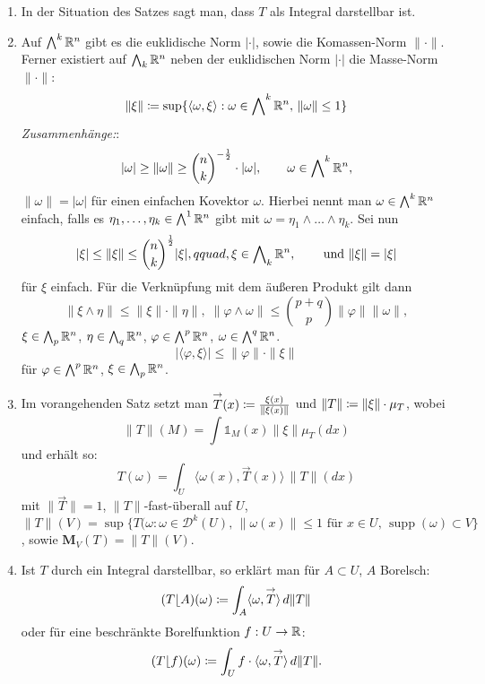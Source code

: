 \documentclass[a4paper,twoside,DIV15,BCOR12mm]{scrbook}
\newcommand{\MN}{\mathbf M}
\newcommand{\bw}{\bigwedge\nolimits}
\DeclareMathOperator{\supp}{supp}
\newcommand{\MR}{\lfloor}
\begin{document}
\begin{bemerkung}
\begin{enumerate}[(1)]
	\item In der Situation des Satzes sagt man, dass $T$ als Integral darstellbar ist.
	\item Auf $\bw^k \MdR^n$ gibt es die euklidische Norm $|\cdot|$, sowie die Komassen-Norm $\|\cdot\|$. Ferner existiert auf $\bw_k \MdR^n$ neben der euklidischen Norm $|\cdot|$ die Masse-Norm $\|\cdot\|$:
	$$
		\|\xi\| \da \sup\{ \langle \omega,\xi \rangle : \omega \in \bw^k \MdR^n,\, \|\omega\| \leq 1 \}
	$$
	\emph{Zusammenhänge:}:
	$$
		|\omega| \geq \|\omega\| \geq {\binom n k}^{-\frac12} \cdot |\omega|,\qquad \omega \in \bw^k\MdR^n,
	$$
$\|\omega\|=|\omega|$ für einen einfachen Kovektor $\omega$. Hierbei nennt man $\omega \in \bw^k\MdR^n$ einfach, falls es $\eta_1,\dots,\eta_k \in \bw^1 \MdR^n$ gibt mit $\omega=\eta_1\wedge\dots\wedge\eta_k$. Sei nun
	$$
		|\xi| \leq \|\xi\| \leq {\binom n k}^{\frac12} |\xi|,\\qquad, \xi \in \bw_k \MdR^n,\,\qquad\text{und } \|\xi\|=|\xi|
	$$
	für $\xi$ einfach. Für die Verknüpfung mit dem äußeren Produkt gilt dann
	$$
		\|\xi \wedge \eta\| \leq \|\xi\| \cdot \|\eta\|,\; \|\varphi \wedge \omega\| \leq \binom{p+q}p \|\varphi\| \|\omega\|,
	$$
	$\xi \in \bw_p \MdR^n$, $\eta \in \bw_q \MdR^n$, $\varphi \in \bw^p \MdR^n$, $\omega \in \bw^q \MdR^n$.
	$$
		|\langle \varphi, \xi \rangle| \leq \|\varphi\| \cdot \|\xi\|
	$$
	für $\varphi \in \bw^p\MdR^n$, $\xi \in \bw_p\MdR^n$.
	\item Im vorangehenden Satz setzt man $\overset\rightarrow T(x) \da \frac{\xi(x)}{\|\xi(x)\|}$ und $\|T\| \da \|\xi\| \cdot \mu_T$, wobei 
	$$
	\|T\|(M) = \int \mathbb{1}_M(x) \|\xi\| \mu_T(dx)$$ und erhält so:
	$$
		T(\omega) = \int_U \langle\omega(x),\overset\rightarrow T(x)\rangle \, \|T\|(dx)
	$$
	mit $\|\overset\rightarrow T\| = 1$, $\|T\|$-fast-überall auf $U$, $\|T\|(V) = \sup\{T(\omega : \omega \in \mathcal D^k(U),\, \|\omega(x)\| \leq 1 \text{ für } x\in U,\, \supp(\omega) \subset V\}$, sowie $\MN_V(T) = \|T\|(V)$.
	\item Ist $T$ durch ein Integral darstellbar, so erklärt man für $A \subset U$, $A$ Borelsch:
	$$
		(T\MR A)(\omega) \da \int_A\langle \omega,\overset\rightarrow T \rangle \, d\|T\|
	$$
	oder für eine beschränkte Borelfunktion $f: U \to \mathbb{R}$:
	$$
		(T\MR f)(\omega) \da \int_U f\cdot \langle\omega,\overset\rightarrow T\rangle \, d\|T\|.
	$$
\end{enumerate}
\end{bemerkung}
\end{document}
